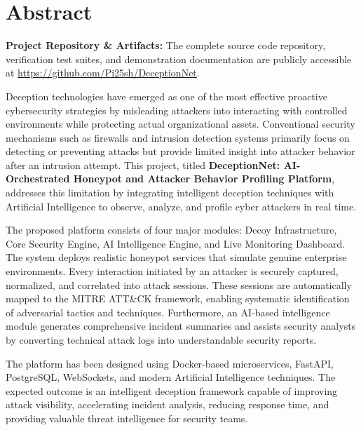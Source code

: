 \documentclass[12pt,a4paper]{report}
\begin{document}
\clearpage


\chapter*{Abstract}


\noindent \textbf{Project Repository \& Artifacts:} The complete source code repository, verification test suites, and demonstration documentation are publicly accessible at \url{https://github.com/Pi25sh/DeceptionNet}.

Deception technologies have emerged as one of the most effective proactive cybersecurity strategies by misleading attackers into interacting with controlled environments while protecting actual organizational assets. Conventional security mechanisms such as firewalls and intrusion detection systems primarily focus on detecting or preventing attacks but provide limited insight into attacker behavior after an intrusion attempt. This project, titled \textbf{DeceptionNet: AI-Orchestrated Honeypot and Attacker Behavior Profiling Platform}, addresses this limitation by integrating intelligent deception techniques with Artificial Intelligence to observe, analyze, and profile cyber attackers in real time.

The proposed platform consists of four major modules: Decoy Infrastructure, Core Security Engine, AI Intelligence Engine, and Live Monitoring Dashboard. The system deploys realistic honeypot services that simulate genuine enterprise environments. Every interaction initiated by an attacker is securely captured, normalized, and correlated into attack sessions. These sessions are automatically mapped to the MITRE ATT\&CK framework, enabling systematic identification of adversarial tactics and techniques. Furthermore, an AI-based intelligence module generates comprehensive incident summaries and assists security analysts by converting technical attack logs into understandable security reports.

The platform has been designed using Docker-based microservices, FastAPI, PostgreSQL, WebSockets, and modern Artificial Intelligence techniques. The expected outcome is an intelligent deception framework capable of improving attack visibility, accelerating incident analysis, reducing response time, and providing valuable threat intelligence for security teams.
\end{document}
